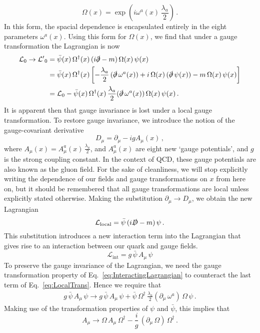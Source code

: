 %
\begin{equation}
\Omega(x)=\exp\left(i\omega^a(x)\,\frac{\lambda_a}{2}\right)\, .
\label{eq:LocalGaugeTransformation}
\end{equation}
%
In this form, the spacial dependence is encapsulated entirely in the eight parameters $\omega^a(x)$.  Using this form for $\Omega(x)$, we find that under a gauge transformation the Lagrangian is now
%
\begin{align}
\mathcal{L}_0\rightarrow\mathcal{L'}_0&=\bar{\psi}(x)\,\Omega^\dag(x)\,(i\slashed{\partial}-m)\,\Omega(x)\,\psi(x)\nonumber\\
&=\bar{\psi}(x)\,\Omega^\dag(x)\left[-\frac{\lambda_a}{2}\,(\slashed{\partial}\,\omega^a(x))+i\,\Omega(x)\,(\slashed{\partial}\,\psi(x))-m\,\Omega(x)\,\psi(x)\right]\nonumber\\
&= \mathcal{L}_0-\bar{\psi}(x)\,\Omega^\dag(x)\,\frac{\lambda_a}{2}(\slashed{\partial}\,\omega^a(x))\,\Omega(x)\,\psi(x)\, .\\
\label{eq:LocalTrans}
\end{align}
%
It is apparent then that gauge invariance is lost under a local gauge transformation. To restore gauge invariance, we introduce the notion of the gauge-covariant derivative
%
\begin{equation}
D_\mu = \partial_\mu - ig A_\mu(x)\, ,
\label{eq:CovariantDerivative}
\end{equation}
%
where $A_\mu(x)=A_\mu^a(x)\,\frac{\lambda_a}{2}$, and $A_\mu^a(x)$ are eight new `gauge potentials', and $g$ is the strong coupling constant. In the context of QCD, these gauge potentials are also known as the gluon field. For the sake of cleanliness, we will stop explicitly writing the dependence of our fields and gauge transformations on $x$ from here on, but it should be remembered that all gauge transformations are local unless explicitly stated otherwise. Making the substitution $\partial_\mu\rightarrow D_\mu$, we obtain the new Lagrangian
%
\begin{equation}
\mathcal{L}_\text{local} = \bar{\psi}\,(i\slashed{D}-m)\,\psi\,.
\end{equation}
%
This substitution introduces a new interaction term into the Lagrangian that gives rise to an interaction between our quark and gauge fields.
%
\begin{equation}
\mathcal{L}_\text{int} = g\,\bar{\psi}\,A_\mu\,\psi
\label{eq:InteractingLagrangian}
\end{equation}
%
To preserve the gauge invariance of the Lagrangian, we need the gauge transformation property of Eq.~\ref{eq:InteractingLagrangian} to counteract the last term of Eq.~\ref{eq:LocalTrans}. Hence we require that
%
\begin{align}
g\,\bar{\psi}\,A_\mu\,\psi \rightarrow g\,\bar{\psi}\,A_\mu\,\psi + \bar{\psi}\,\Omega^\dag\,\frac{\lambda_a}{2}(\partial_\mu\,\omega^a)\,\Omega\,\psi\, .
\end{align}
%
Making use of the transformation properties of $\psi$ and $\bar{\psi}$, this implies that
%
\begin{equation}
A_\mu\rightarrow \Omega\,A_\mu\,\Omega^\dag - \frac{i}{g}\,(\partial_\mu\,\Omega)\,\Omega^\dag\, . 
\end{equation}\\
%

